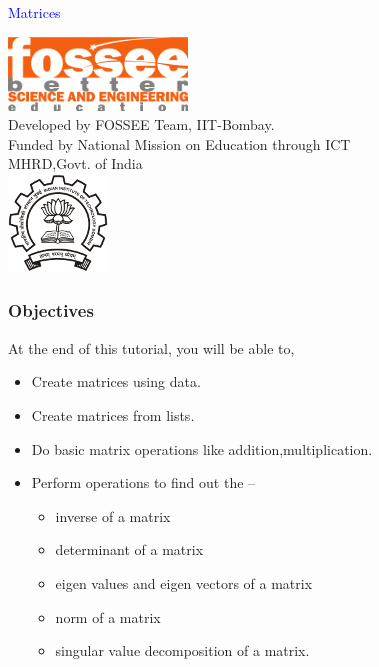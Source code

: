 \documentclass[presentation]{beamer}
\title{}
\author{FOSSEE}
\date{}
\begin{document}
\begin{frame}

\begin{center}
\vspace{12pt}
\textcolor{blue}{\huge Matrices}
\end{center}
\vspace{18pt}
\begin{center}
\vspace{10pt}
\includegraphics[scale=0.95]{../images/fossee-logo.png}\\
\vspace{5pt}
\scriptsize Developed by FOSSEE Team, IIT-Bombay. \\ 
\scriptsize Funded by National Mission on Education through ICT\\
\scriptsize  MHRD,Govt. of India\\
\includegraphics[scale=0.30]{../images/iitb-logo.png}\\
\end{center}
\end{frame}
\begin{frame}
\frametitle{Objectives}
\label{sec-2}

  At the end of this tutorial, you will be able to, 


\begin{itemize}
\item Create matrices using data.
\item Create matrices from lists.
\item Do basic matrix operations like addition,multiplication.
\item Perform operations to find out the --
\begin{itemize}
\item inverse of a matrix
\item determinant of a matrix
\item eigen values and eigen vectors of a matrix
\item norm of a matrix
\item singular value decomposition of a matrix.
\end{itemize}
\end{itemize}
\end{frame}
\end{document}
